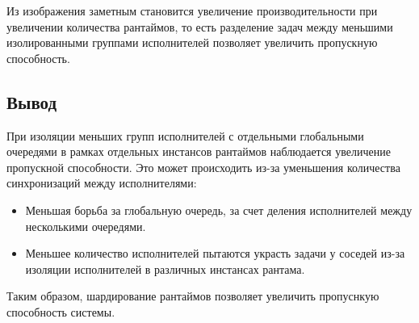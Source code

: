 Из изображения заметным становится увеличение производительности при увеличении количества рантаймов, то есть разделение задач между меньшими изолированными группами исполнителей позволяет увеличить пропускную способность.

\subsection{Вывод}

При изоляции меньших групп исполнителей с отдельными глобальными очередями в рамках отдельных инстансов рантаймов наблюдается увеличение пропускной способности. Это может происходить из-за уменьшения количества синхронизаций между исполнителями:

\begin{itemize}
    \item Меньшая борьба за глобальную очередь, за счет деления исполнителей между несколькими очередями.
    \item Меньшее количество исполнителей пытаются украсть задачи у соседей из-за изоляции исполнителей в различных инстансах рантама.
\end{itemize}

Таким образом, шардирование рантаймов позволяет увеличить пропуснкую способность системы.
